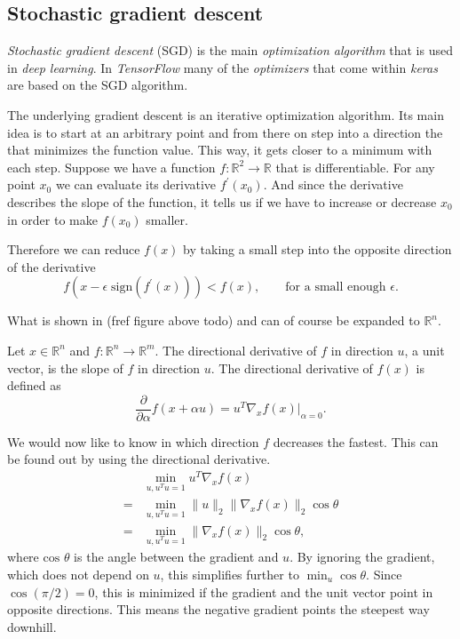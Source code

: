 \subsection{Stochastic gradient descent}
\emph{Stochastic gradient descent} (SGD) is the main \emph{optimization algorithm} that is used in \emph{deep learning}.
In \emph{TensorFlow} many of the \emph{optimizers} that come within \emph{keras} are based on the SGD algorithm.

The underlying gradient descent is an iterative optimization algorithm.
Its main idea is to start at an arbitrary point and from there on step into a direction the that minimizes the function value.
This way, it gets closer to a minimum with each step.
Suppose we have a function \(f : \mathbb{R}^2 \rightarrow \mathbb{R}\) that is differentiable.
For any point \(x_0\) we can evaluate its derivative \(f^{\prime}(x_0)\).
And since the derivative describes the slope of the function, it tells us if we have to increase or decrease \(x_0\) in order to make \(f(x_0)\) smaller.

Therefore we can reduce \(f(x)\) by taking a small step into the opposite direction of the derivative \cite{cauchy}
\begin{equation}
    \label{eq:cauchy}
    f(x - \epsilon \; \text{sign}(f^{\prime}(x))) < f(x), \qquad \text{for a small enough } \epsilon.
\end{equation}


What is shown in (fref figure above todo) and  can of course be expanded to \(\mathbb{R}^n\).

Let \(x \in \mathbb{R}^n\) and \(f : \mathbb{R}^n \rightarrow \mathbb{R}^m\).
The directional derivative of \(f\) in direction \(u\), a unit vector, is the slope of \(f\) in direction \(u\).
The directional derivative of \(f(x)\) is defined as 
\begin{equation}
    \frac{\partial}{\partial \alpha} f(x + \alpha u) = u^{T} \nabla_x f(x) \big\vert_{\alpha = 0}.
\end{equation}

We would now like to know in which direction \(f\) decreases the fastest.
This can be found out by using the directional derivative.
\begin{align}
      &\min_{u, u^{T}u = 1} u^{T} \nabla_x f(x) \\
    = &\min_{u, u^{T}u = 1} \lVert u \rVert_2 \lVert \nabla_x f(x) \rVert_2 \cos \theta \\
    = &\min_{u, u^{T}u = 1} \lVert \nabla_x f(x) \rVert_2 \cos \theta,
\end{align}
where \(\text{cos } \theta\) is the angle between the gradient and \(u\).
By ignoring the gradient, which does not depend on \(u\), this simplifies further to \(\min_{u} \cos \theta\).
Since \(\cos(\pi/2) = 0\), this is minimized if the gradient and the unit vector point in opposite directions.
This means the negative gradient points the steepest way downhill.


